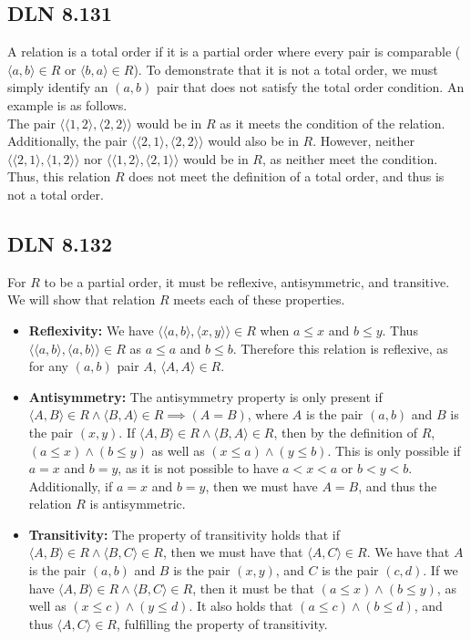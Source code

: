 \documentclass[titlepage]{article}
\begin{document}
\subsection{DLN 8.131}

A relation is a total order if it is a partial order where every pair is comparable ($\langle a,b \rangle \in R$ or $\langle b,a \rangle \in R$). To demonstrate that it is not a total order, we must simply identify an $(a,b)$ pair that does not satisfy the total order condition. An example is as follows.\\
The pair $\langle \langle 1,2 \rangle , \langle 2,2 \rangle \rangle$ would be in $R$ as it meets the condition of the relation. Additionally, the pair $\langle \langle 2,1 \rangle , \langle 2,2 \rangle \rangle$ would also be in $R$. However, neither $\langle \langle 2,1 \rangle , \langle 1,2 \rangle \rangle$ nor $\langle \langle 1,2 \rangle , \langle 2,1 \rangle \rangle$ would be in $R$, as neither meet the condition. Thus, this relation $R$ does not meet the definition of a total order, and thus is not a total order.

\subsection{DLN 8.132}

For $R$ to be a partial order, it must be reflexive, antisymmetric, and transitive. We will show that relation $R$ meets each of these properties.
 
\begin{itemize}
\item \textbf{Reflexivity:} We have $\langle \langle a,b \rangle , \langle x,y \rangle \rangle \in R$ when $a \leq x$ and $b \leq y$. Thus $\langle \langle a,b \rangle , \langle a,b \rangle \rangle \in R$ as $a \leq a$ and $b \leq b$. Therefore this relation is reflexive, as for any $(a,b)$ pair $A$, $\langle A,A \rangle \in R$.
\item \textbf{Antisymmetry:} The antisymmetry property is only present if $\langle A,B \rangle \in R \land \langle B,A \rangle \in R \implies (A=B)$, where $A$ is the pair $(a,b)$ and $B$ is the pair $(x,y)$. If $\langle A,B \rangle \in R \land \langle B,A \rangle \in R$, then by the definition of $R$, $(a \leq x) \land (b \leq y)$ as well as $(x \leq a) \land (y \leq b)$. This is only possible if $a=x$ and $b=y$, as it is not possible to have $a < x < a$ or $b < y < b$. Additionally, if $a=x$ and $b=y$, then we must have $A=B$, and thus the relation $R$ is antisymmetric. 
\item \textbf{Transitivity:} The property of transitivity holds that if $\langle A,B \rangle \in R \land \langle B,C \rangle \in R$, then we must have that $\langle A,C \rangle \in R$. We have that $A$ is the pair $(a,b)$ and $B$ is the pair $(x,y)$, and $C$ is the pair $(c,d)$. If we have $\langle A,B \rangle \in R \land \langle B,C \rangle \in R$, then it must be that $(a \leq x) \land (b \leq y)$, as well as $(x \leq c) \land (y \leq d)$. It also holds that $(a \leq c) \land (b \leq d)$, and thus $\langle A,C \rangle \in R$, fulfilling the property of transitivity.
\end{itemize}
\end{document}

